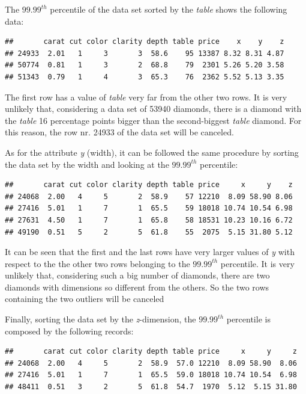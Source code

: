\documentclass[
]{article}
\begin{document}
The \(99.99^{th}\) percentile of the data set sorted by the \emph{table}
shows the following data:

\begin{verbatim}
##       carat cut color clarity depth table price    x    y    z
## 24933  2.01   1     3       3  58.6    95 13387 8.32 8.31 4.87
## 50774  0.81   1     3       2  68.8    79  2301 5.26 5.20 3.58
## 51343  0.79   1     4       3  65.3    76  2362 5.52 5.13 3.35
\end{verbatim}

The first row has a value of \emph{table} very far from the other two
rows. It is very unlikely that, considering a data set of 53940
diamonds, there is a diamond with the \emph{table} 16 percentage points
bigger than the second-biggest \emph{table} diamond. For this reason,
the row nr. 24933 of the data set will be canceled.

As for the attribute \emph{y} (width), it can be followed the same
procedure by sorting the data set by the width and looking at the
\(99.99^{th}\) percentile:

\begin{verbatim}
##       carat cut color clarity depth table price     x     y    z
## 24068  2.00   4     5       2  58.9    57 12210  8.09 58.90 8.06
## 27416  5.01   1     7       1  65.5    59 18018 10.74 10.54 6.98
## 27631  4.50   1     7       1  65.8    58 18531 10.23 10.16 6.72
## 49190  0.51   5     2       5  61.8    55  2075  5.15 31.80 5.12
\end{verbatim}

It can be seen that the first and the last rows have very larger values
of \emph{y} with respect to the the other two rows belonging to the
\(99.99^{th}\) percentile. It is very unlikely that, considering such a
big number of diamonds, there are two diamonds with dimensions so
different from the others. So the two rows containing the two outliers
will be canceled

Finally, sorting the data set by the \emph{z}-dimension, the
\(99.99^{th}\) percentile is composed by the following records:

\begin{verbatim}
##       carat cut color clarity depth table price     x     y     z
## 24068  2.00   4     5       2  58.9  57.0 12210  8.09 58.90  8.06
## 27416  5.01   1     7       1  65.5  59.0 18018 10.74 10.54  6.98
## 48411  0.51   3     2       5  61.8  54.7  1970  5.12  5.15 31.80
\end{verbatim}
\end{document}
